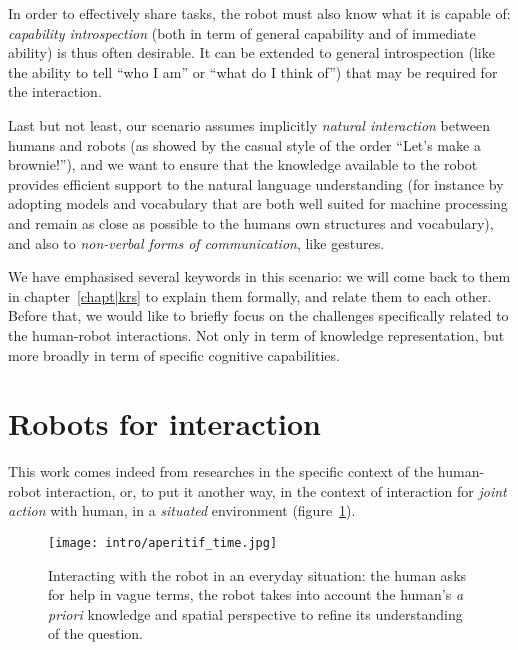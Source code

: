 In order to effectively share tasks, the robot must also know what it is
capable of: \emph{capability introspection} (both in term of general capability
and of immediate ability) is thus often desirable. It can be extended to
general introspection (like the ability to tell ``who I am'' or ``what do I
think of'') that may be required for the interaction.

Last but not least, our scenario assumes implicitly \emph{natural interaction}
between humans and robots (as showed by the casual style of the order ``Let's
make a brownie!''), and we want to ensure that the
knowledge available to the robot provides efficient support to the natural
language understanding (for instance by adopting models and vocabulary that are
both well suited for machine processing and remain as close as possible to the
humans own structures and vocabulary), and also to \emph{non-verbal forms of
communication}, like gestures.


We have emphasised several keywords in this scenario: we will come back to them
in chapter~\ref{chapt|krs} to explain them formally, and relate them to each
other. Before that, we would like to briefly focus on the challenges
specifically related to the human-robot interactions. Not only in term of
knowledge representation, but more broadly in term of specific cognitive
capabilities.


\section{Robots for interaction}
\label{sect|hri-context}

This work comes indeed from researches in the specific context of the
human-robot interaction, or, to put it another way, in the context of
interaction for \emph{joint action} with human,  in a \emph{situated}
environment (figure~\ref{fig|aperitif}).

\begin{figure}%
    \centering
    \texttt{[image: intro/aperitif\_time.jpg]} 

    \caption{Interacting with the robot in an everyday situation: the human
    asks for help in vague terms, the robot takes into account the human's {\it
    a priori} knowledge and spatial perspective to refine its understanding of
    the question.} 

    \label{fig|aperitif} 
\end{figure}

